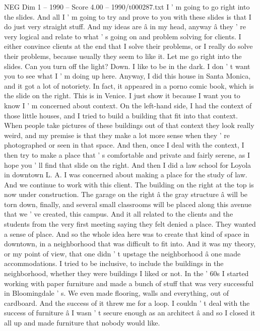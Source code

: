 \begin{textsample}{NEG Dim 1 – 1990 – Score 4.00 – 1990/t000287.txt}  \label{ex:f1_neg_006}
I ' m going to go right into the slides.
And all I ' m going to try and prove to you with these slides is that I do just very straight stuff.
And my ideas are â in my head, anyway â they ' re very logical and relate to what ' s going on and problem solving for clients.
I either convince clients at the end that I solve their problems, or I really do solve their problems, because usually they seem to like it.
Let me go right into the slides.
Can you turn off the light?
Down.
I like to be in the dark.
I don ' t want you to see what I ' m doing up here.
Anyway, I did this house in Santa Monica, and it got a lot of notoriety.
In fact, it appeared in a porno comic book, which is the slide on the right.
This is in Venice.
I just show it because I want you to know I ' m concerned about context.
On the left-hand side, I had the context of those little houses, and I tried to build a building that fit into that context.
When people take pictures of these buildings out of that context they look really weird, and my premise is that they make a lot more sense when they ' re photographed or seen in that space.
And then, once I deal with the context, I then try to make a place that ' s comfortable and private and fairly serene, as I hope you ' ll find that slide on the right.
And then I did a law school for Loyola in downtown L.
A.
I was concerned about making a place for the study of law.
And we continue to work with this client.
The building on the right at the top is now under construction.
The garage on the right â the gray structure â will be torn down, finally, and several small classrooms will be placed along this avenue that we ' ve created, this campus.
And it all related to the clients and the students from the very first meeting saying they felt denied a place.
They wanted a sense of place.
And so the whole idea here was to create that kind of space in downtown, in a neighborhood that was difficult to fit into.
And it was my theory, or my point of view, that one didn ' t upstage the neighborhood â one made accommodations.
I tried to be inclusive, to include the buildings in the neighborhood, whether they were buildings I liked or not.
In the ' 60s I started working with paper furniture and made a bunch of stuff that was very successful in Bloomingdale ' s.
We even made flooring, walls and everything, out of cardboard.
And the success of it threw me for a loop.
I couldn ' t deal with the success of furniture â I wasn ' t secure enough as an architect â and so I closed it all up and made furniture that nobody would like.

\end{textsample}
